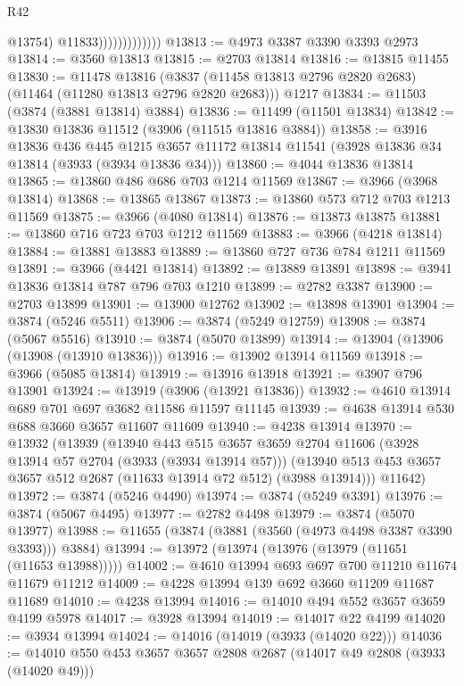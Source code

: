 \begin{lexlean}{R42}
\begin{coremodule}
                                @13754)
                              @11833)))))))))))))
@13813 := @4973 @3387 @3390 @3393 @2973
@13814 := @3560 @13813
@13815 := @2703 @13814
@13816 := @13815 @11455
@13830 := @11478
    @13816
    (@3837 (@11458 @13813 @2796 @2820 @2683) (@11464 (@11280 @13813 @2796 @2820 @2683)))
    @1217
@13834 := @11503 (@3874 (@3881 @13814) @3884)
@13836 := @11499 (@11501 @13834)
@13842 := @13830 @13836 @11512 (@3906 (@11515 @13816 @3884))
@13858 := @3916
    @13836
    @436
    @445
    @1215
    @3657
    @11172
    @13814
    @11541
    (@3928 @13836 @34 @13814 (@3933 (@3934 @13836 @34)))
@13860 := @4044 @13836 @13814
@13865 := @13860 @486 @686 @703 @1214 @11569
@13867 := @3966 (@3968 @13814)
@13868 := @13865 @13867
@13873 := @13860 @573 @712 @703 @1213 @11569
@13875 := @3966 (@4080 @13814)
@13876 := @13873 @13875
@13881 := @13860 @716 @723 @703 @1212 @11569
@13883 := @3966 (@4218 @13814)
@13884 := @13881 @13883
@13889 := @13860 @727 @736 @784 @1211 @11569
@13891 := @3966 (@4421 @13814)
@13892 := @13889 @13891
@13898 := @3941 @13836 @13814 @787 @796 @703 @1210
@13899 := @2782 @3387
@13900 := @2703 @13899
@13901 := @13900 @12762
@13902 := @13898 @13901
@13904 := @3874 (@5246 @5511)
@13906 := @3874 (@5249 @12759)
@13908 := @3874 (@5067 @5516)
@13910 := @3874 (@5070 @13899)
@13914 := @13904 (@13906 (@13908 (@13910 @13836)))
@13916 := @13902 @13914 @11569
@13918 := @3966 (@5085 @13814)
@13919 := @13916 @13918
@13921 := @3907 @796 @13901
@13924 := @13919 (@3906 (@13921 @13836))
@13932 := @4610 @13914 @689 @701 @697 @3682 @11586 @11597 @11145
@13939 := @4638 @13914 @530 @688 @3660 @3657 @11607 @11609
@13940 := @4238 @13914
@13970 := @13932
    (@13939
      (@13940
        @443
        @515
        @3657
        @3659
        @2704
        @11606
        (@3928 @13914 @57 @2704 (@3933 (@3934 @13914 @57)))
        (@13940 @513 @453 @3657 @3657 @512 @2687 (@11633 @13914 @72 @512) (@3988 @13914)))
      @11642)
@13972 := @3874 (@5246 @4490)
@13974 := @3874 (@5249 @3391)
@13976 := @3874 (@5067 @4495)
@13977 := @2782 @4498
@13979 := @3874 (@5070 @13977)
@13988 := @11655 (@3874 (@3881 (@3560 (@4973 @4498 @3387 @3390 @3393))) @3884)
@13994 := @13972 (@13974 (@13976 (@13979 (@11651 (@11653 @13988)))))
@14002 := @4610 @13994 @693 @697 @700 @11210 @11674 @11679 @11212
@14009 := @4228 @13994 @139 @692 @3660 @11209 @11687 @11689
@14010 := @4238 @13994
@14016 := @14010 @494 @552 @3657 @3659 @4199 @5978
@14017 := @3928 @13994
@14019 := @14017 @22 @4199
@14020 := @3934 @13994
@14024 := @14016 (@14019 (@3933 (@14020 @22)))
@14036 := @14010 @550 @453 @3657 @3657 @2808 @2687 (@14017 @49 @2808 (@3933 (@14020 @49)))

\end{coremodule}
\end{lexlean}
